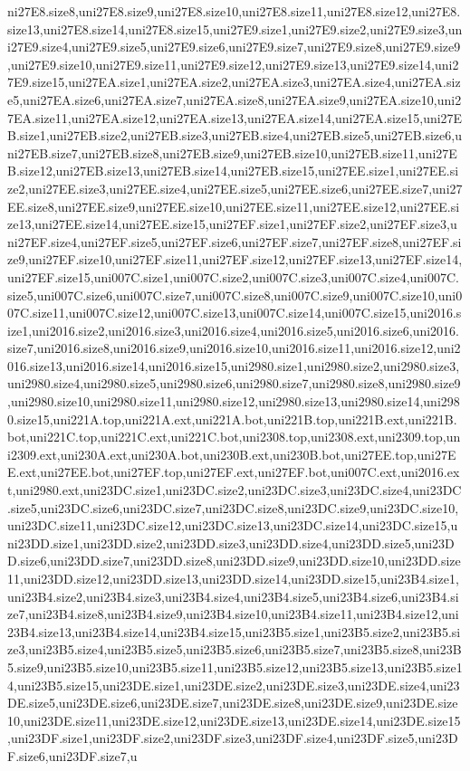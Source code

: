 ni27E8.size8,uni27E8.size9,uni27E8.size10,uni27E8.size11,uni27E8.size12,uni27E8.size13,uni27E8.size14,uni27E8.size15,uni27E9.size1,uni27E9.size2,uni27E9.size3,uni27E9.size4,uni27E9.size5,uni27E9.size6,uni27E9.size7,uni27E9.size8,uni27E9.size9,uni27E9.size10,uni27E9.size11,uni27E9.size12,uni27E9.size13,uni27E9.size14,uni27E9.size15,uni27EA.size1,uni27EA.size2,uni27EA.size3,uni27EA.size4,uni27EA.size5,uni27EA.size6,uni27EA.size7,uni27EA.size8,uni27EA.size9,uni27EA.size10,uni27EA.size11,uni27EA.size12,uni27EA.size13,uni27EA.size14,uni27EA.size15,uni27EB.size1,uni27EB.size2,uni27EB.size3,uni27EB.size4,uni27EB.size5,uni27EB.size6,uni27EB.size7,uni27EB.size8,uni27EB.size9,uni27EB.size10,uni27EB.size11,uni27EB.size12,uni27EB.size13,uni27EB.size14,uni27EB.size15,uni27EE.size1,uni27EE.size2,uni27EE.size3,uni27EE.size4,uni27EE.size5,uni27EE.size6,uni27EE.size7,uni27EE.size8,uni27EE.size9,uni27EE.size10,uni27EE.size11,uni27EE.size12,uni27EE.size13,uni27EE.size14,uni27EE.size15,uni27EF.size1,uni27EF.size2,uni27EF.size3,uni27EF.size4,uni27EF.size5,uni27EF.size6,uni27EF.size7,uni27EF.size8,uni27EF.size9,uni27EF.size10,uni27EF.size11,uni27EF.size12,uni27EF.size13,uni27EF.size14,uni27EF.size15,uni007C.size1,uni007C.size2,uni007C.size3,uni007C.size4,uni007C.size5,uni007C.size6,uni007C.size7,uni007C.size8,uni007C.size9,uni007C.size10,uni007C.size11,uni007C.size12,uni007C.size13,uni007C.size14,uni007C.size15,uni2016.size1,uni2016.size2,uni2016.size3,uni2016.size4,uni2016.size5,uni2016.size6,uni2016.size7,uni2016.size8,uni2016.size9,uni2016.size10,uni2016.size11,uni2016.size12,uni2016.size13,uni2016.size14,uni2016.size15,uni2980.size1,uni2980.size2,uni2980.size3,uni2980.size4,uni2980.size5,uni2980.size6,uni2980.size7,uni2980.size8,uni2980.size9,uni2980.size10,uni2980.size11,uni2980.size12,uni2980.size13,uni2980.size14,uni2980.size15,uni221A.top,uni221A.ext,uni221A.bot,uni221B.top,uni221B.ext,uni221B.bot,uni221C.top,uni221C.ext,uni221C.bot,uni2308.top,uni2308.ext,uni2309.top,uni2309.ext,uni230A.ext,uni230A.bot,uni230B.ext,uni230B.bot,uni27EE.top,uni27EE.ext,uni27EE.bot,uni27EF.top,uni27EF.ext,uni27EF.bot,uni007C.ext,uni2016.ext,uni2980.ext,uni23DC.size1,uni23DC.size2,uni23DC.size3,uni23DC.size4,uni23DC.size5,uni23DC.size6,uni23DC.size7,uni23DC.size8,uni23DC.size9,uni23DC.size10,uni23DC.size11,uni23DC.size12,uni23DC.size13,uni23DC.size14,uni23DC.size15,uni23DD.size1,uni23DD.size2,uni23DD.size3,uni23DD.size4,uni23DD.size5,uni23DD.size6,uni23DD.size7,uni23DD.size8,uni23DD.size9,uni23DD.size10,uni23DD.size11,uni23DD.size12,uni23DD.size13,uni23DD.size14,uni23DD.size15,uni23B4.size1,uni23B4.size2,uni23B4.size3,uni23B4.size4,uni23B4.size5,uni23B4.size6,uni23B4.size7,uni23B4.size8,uni23B4.size9,uni23B4.size10,uni23B4.size11,uni23B4.size12,uni23B4.size13,uni23B4.size14,uni23B4.size15,uni23B5.size1,uni23B5.size2,uni23B5.size3,uni23B5.size4,uni23B5.size5,uni23B5.size6,uni23B5.size7,uni23B5.size8,uni23B5.size9,uni23B5.size10,uni23B5.size11,uni23B5.size12,uni23B5.size13,uni23B5.size14,uni23B5.size15,uni23DE.size1,uni23DE.size2,uni23DE.size3,uni23DE.size4,uni23DE.size5,uni23DE.size6,uni23DE.size7,uni23DE.size8,uni23DE.size9,uni23DE.size10,uni23DE.size11,uni23DE.size12,uni23DE.size13,uni23DE.size14,uni23DE.size15,uni23DF.size1,uni23DF.size2,uni23DF.size3,uni23DF.size4,uni23DF.size5,uni23DF.size6,uni23DF.size7,u